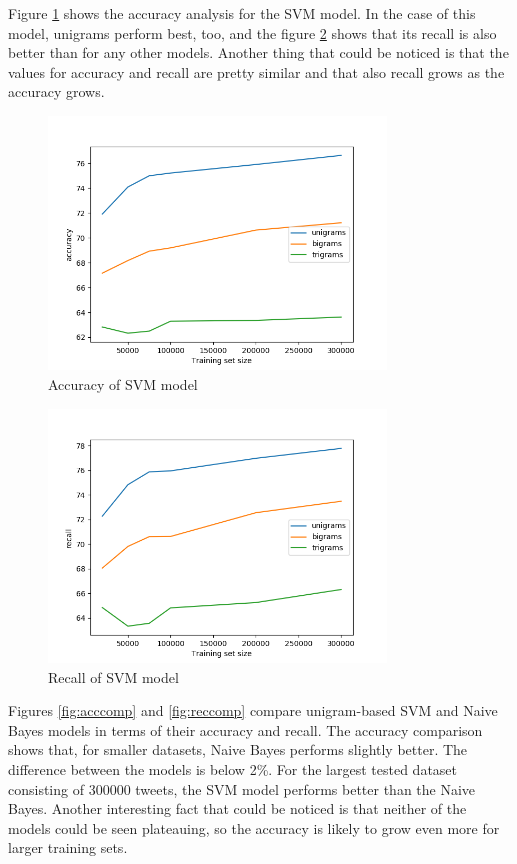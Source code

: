 Figure \ref{fig:svmacc} shows the accuracy analysis for the SVM model. In the case of this model, unigrams perform best, too, and the figure \ref{fig:svmrec} shows that its recall is also better than for any other models. Another thing that could be noticed is that the values for accuracy and recall are pretty similar and that also recall grows as the accuracy grows. 

\begin{figure}[ht]
    \centering
    \includegraphics[width=0.8\textwidth]{SVMacc}
    \caption{Accuracy of SVM model}
    \label{fig:svmacc}
\end{figure}

\begin{figure}[ht]
    \centering
    \includegraphics[width=0.8\textwidth]{SVMrec}
    \caption{Recall of SVM model}
    \label{fig:svmrec}
\end{figure}

Figures \ref{fig:acccomp} and \ref{fig:reccomp} compare unigram-based SVM and Naive Bayes models in terms of their accuracy and recall. The accuracy comparison shows that, for smaller datasets, Naive Bayes performs slightly better. The difference between the models is below 2\%. For the largest tested dataset consisting of 300000 tweets, the SVM model performs better than the Naive Bayes. Another interesting fact that could be noticed is that neither of the models could be seen plateauing, so the accuracy is likely to grow even more for larger training sets.


